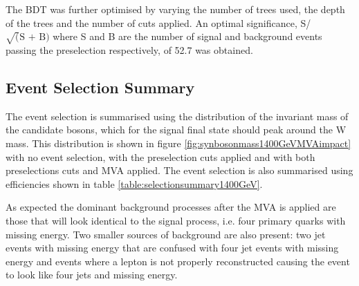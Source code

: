 The BDT was further optimised by varying the number of trees used, the depth of the trees and the number of cuts applied.  An optimal significance, S/$\sqrt(\text{S + B})$ where S and B are the number of signal and background events passing the preselection respectively, of 52.7 was obtained. 


\subsection{Event Selection Summary}
\label{sec:eventselsummary1400GeV}
The event selection is summarised using the distribution of the invariant mass of the candidate bosons, which for the signal final state should peak around the W mass.  This distribution is shown in figure \ref{fig:synbosonmass1400GeVMVAimpact} with no event selection, with the preselection cuts applied and with both preselections cuts and MVA applied.  The event selection is also summarised using efficiencies shown in table \ref{table:selectionsummary1400GeV}.

As expected the dominant background processes after the MVA is applied are those that will look identical to the signal process, i.e. four primary quarks with missing energy.  Two smaller sources of background are also present: two jet events with missing energy that are confused with four jet events with missing energy and events where a lepton is not properly reconstructed causing the event to look like four jets and missing energy.  

